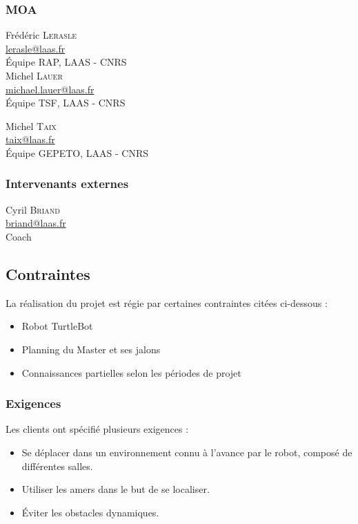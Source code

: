 \documentclass[10pt,a4paper]{article}
\begin{document}
\subsubsection{MOA}
\begin{minipage}[t]{0.46 \textwidth} 
Frédéric \textsc{Lerasle} \\
\href{mailto:lerasle@laas.fr}{lerasle@laas.fr} \\
Équipe RAP, LAAS - CNRS \\[0.3cm]
Michel \textsc{Lauer} \\
\href{mailto:michael.lauer@laas.fr}{michael.lauer@laas.fr} \\
Équipe TSF, LAAS - CNRS
\end{minipage} 
\hfill
\begin{minipage}[t]{0.46\textwidth} 
Michel \textsc{Taix} \\
\href{mailto:taix@laas.fr}{taix@laas.fr} \\
Équipe GEPETO, LAAS - CNRS
\end{minipage} 

\subsubsection{Intervenants externes}
\begin{minipage}[t]{0.46\textwidth} 
Cyril \textsc{Briand} \\
\href{mailto:briand@laas.fr}{briand@laas.fr} \\
Coach
\end{minipage} 

\subsection{Contraintes}
\noindent La réalisation du projet est régie par certaines contraintes citées ci-dessous : 
\begin{itemize}
\item Robot TurtleBot
\item Planning du Master et ses jalons 
\item Connaissances partielles selon les périodes de projet
\end{itemize} 

\subsubsection{Exigences}
Les clients ont spécifié plusieurs exigences :
\begin{itemize}
\item Se déplacer dans un environnement connu à l'avance par le robot, composé de différentes salles.
\item Utiliser les amers dans le but de se localiser.
\item Éviter les obstacles dynamiques.
\end{itemize} 
\end{document}
